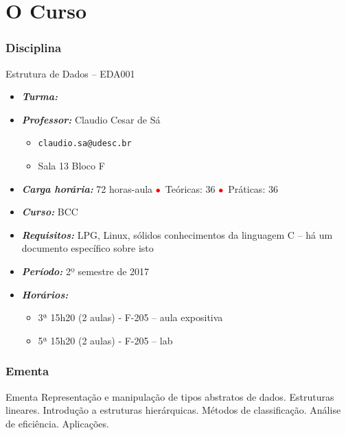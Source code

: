 
\section{O Curso}
\begin{frame}


\frametitle{Disciplina}

\begin{block}{Estrutura de Dados -- EDA001}

\begin{itemize}
\item \emph{\textbf{Turma:}} 
\item \emph{\textbf{Professor:}} Claudio Cesar de Sá
  \begin{itemize}
  \item \texttt{claudio.sa@udesc.br}
  \item Sala 13 Bloco F
  \end{itemize}
\item \emph{\textbf{Carga horária:}} 72 horas-aula 
\textcolor{red}{$\bullet$}~Teóricas: 36 \textcolor{red}{$\bullet$}~Práticas: 36
\item \emph{\textbf{Curso:}} BCC
\item \emph{\textbf{Requisitos:}} LPG, Linux, sólidos conhecimentos da linguagem C -- há um documento específico sobre isto
\item \emph{\textbf{Período:}} 2º semestre de 2017
\item \emph{\textbf{Horários:}}
  \begin{itemize}
  \item 3ª 15h20 (2 aulas) - F-205  -- aula expositiva
  \item 5ª 15h20 (2 aulas) - F-205 -- lab
  
  \end{itemize}

\end{itemize}

\end{block}

\end{frame}


\begin{frame}
\frametitle{Ementa}

\begin{block}{Ementa}
Representação e manipulação de tipos abstratos de dados. Estruturas lineares. Introdução a estruturas hierárquicas. Métodos de classificação. Análise de eficiência. Aplicações.
\end{block}

\end{frame}

